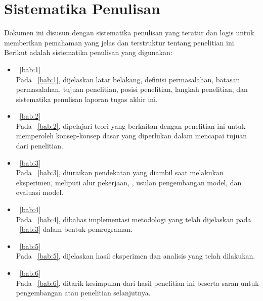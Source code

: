 \section{Sistematika Penulisan}
\label{subbab:1:Sistematika Penulisan}
Dokumen ini disusun dengan sistematika penulisan yang teratur dan logis untuk memberikan pemahaman yang jelas dan terstruktur tentang penelitian ini. Berikut adalah sistematika penulisan yang digunakan:
\begin{itemize}
    \item \bab{}~\ref{bab:1}~\babSatu \\
    Pada \bab{}~\ref{bab:1}, dijelaskan latar belakang, definisi permasalahan, batasan permasalahan, tujuan penelitian, posisi penelitian, langkah penelitian, dan sistematika penulisan laporan tugas akhir ini.
    
    \item \bab{}~\ref{bab:2}~\babDua \\
    Pada \bab{}~\ref{bab:2}, dipelajari teori yang berkaitan dengan penelitian ini untuk memperoleh konsep-konsep dasar yang diperlukan dalam mencapai tujuan dari penelitian.
    
    \item \bab{}~\ref{bab:3}~\babTiga \\
    Pada \bab{}~\ref{bab:3}, diuraikan pendekatan yang diambil saat melakukan eksperimen, meliputi alur pekerjaan, \dataset{}, usulan pengembangan model, dan evaluasi model.
    
    \item \bab{}~\ref{bab:4}~\babEmpat \\
    Pada \bab{}~\ref{bab:4}, dibahas implementasi metodologi yang telah dijelaskan pada \bab{}~\ref{bab:3} dalam bentuk pemrograman.

    \item \bab{}~\ref{bab:5}~\babLima \\
    Pada \bab{}~\ref{bab:5}, dijelaskan hasil eksperimen dan analisis yang telah dilakukan.

    \item \bab{}~\ref{bab:6}~\babEnam \\
    Pada \bab{}~\ref{bab:6}, ditarik kesimpulan dari hasil penelitian ini beserta saran untuk pengembangan atau penelitian selanjutnya.
\end{itemize}
